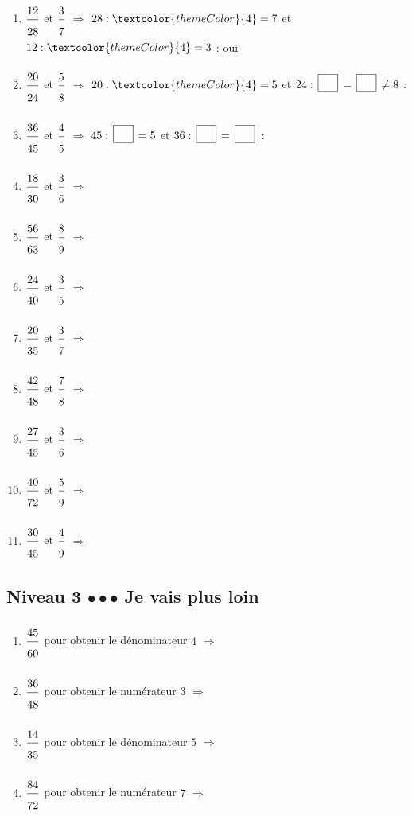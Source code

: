 \begin{enumerate}[leftmargin=*,align=parleft, label=\alph*), itemsep=9pt]
\item $\FA{12}{28}$ et $\FA{3}{7}$ \quad $\Longrightarrow$ \quad $28 : \textcolor{themeColor}{4}=7$ \quad et \quad $12 : \textcolor{themeColor}{4}=3$ \quad : \quad \textcolor{themeColor}{oui}
\item $\FA{20}{24}$ et $\FA{5}{8}$ \quad $\Longrightarrow$ \quad $20 : \textcolor{themeColor}{4}=5$ \quad et \quad $24 : \CaseC=\CaseC \ne 8$ \quad : \quad \Case
\item $\FA{36}{45}$ et $\FA{4}{5}$ \quad $\Longrightarrow$ \quad $45 : \CaseC=5$ \quad et \quad $36 : \CaseC=\CaseC$ \quad : \quad \Case
\item $\FA{18}{30}$ et $\FA{3}{6}$ \quad $\Longrightarrow$
\item $\FA{56}{63}$ et $\FA{8}{9}$ \quad $\Longrightarrow$
\item $\FA{24}{40}$ et $\FA{3}{5}$ \quad $\Longrightarrow$
\item $\FA{20}{35}$ et $\FA{3}{7}$ \quad $\Longrightarrow$
\item $\FA{42}{48}$ et $\FA{7}{8}$ \quad $\Longrightarrow$
\item $\FA{27}{45}$ et $\FA{3}{6}$ \quad $\Longrightarrow$
\item $\FA{40}{72}$ et $\FA{5}{9}$ \quad $\Longrightarrow$
\item $\FA{30}{45}$ et $\FA{4}{9}$ \quad $\Longrightarrow$
\end{enumerate}
 
\newpage
\subsection{Niveau 3 \quad $\bullet\bullet\bullet$ \quad Je vais plus loin}
 
 
\begin{enumerate}[leftmargin=*,align=parleft, label=\alph*), itemsep=9pt]
\item $\FA{45}{60}$ pour obtenir le dénominateur $4$ \quad $\Longrightarrow$
\item $\FA{36}{48}$ pour obtenir le numérateur $3$ \quad $\Longrightarrow$
\item $\FA{14}{35}$ pour obtenir le dénominateur $5$ \quad $\Longrightarrow$
\item $\FA{84}{72}$ pour obtenir le numérateur $7$ \quad $\Longrightarrow$
\end{enumerate}
 
